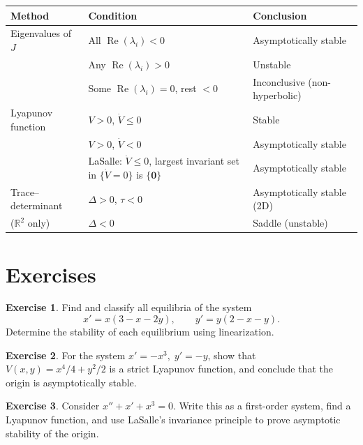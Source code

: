 \documentclass[12pt,a4paper,openany]{book}
\theoremstyle{definition}
\newtheorem{exercise}{Exercise}[chapter]
\theoremstyle{plain}
\theoremstyle{remark}
\newcommand{\R}{\mathbb{R}}
\begin{document}
\begin{center}
\renewcommand{\arraystretch}{1.35}
\begin{tabular}{@{}p{3.8cm}p{5.5cm}p{4.5cm}@{}}
\toprule
\textbf{Method} & \textbf{Condition} & \textbf{Conclusion} \\
\midrule
Eigenvalues of~\(J\) &
All \(\operatorname{Re}(\lambda_i)<0\) &
Asymptotically stable \\
& Any \(\operatorname{Re}(\lambda_i)>0\) &
Unstable \\
& Some \(\operatorname{Re}(\lambda_i)=0\), rest \(<0\) &
Inconclusive (non-hyperbolic) \\
\midrule
Lyapunov function &
\(V>0\), \(\dot{V}\le 0\) &
Stable \\
& \(V>0\), \(\dot{V}<0\) &
Asymptotically stable \\
& LaSalle: \(\dot{V}\le 0\), largest invariant set in \(\{\dot{V}=0\}\) is \(\{\mathbf{0}\}\) &
Asymptotically stable \\
\midrule
Trace--determinant &
\(\Delta>0\), \(\tau<0\) &
Asymptotically stable (2D) \\
(\(\R^2\) only) &
\(\Delta<0\) &
Saddle (unstable) \\
\bottomrule
\end{tabular}
\end{center}

\section{Exercises}
\label{sec:stability-exercises}

\begin{exercise}
\label{exo:classify-equilibria}
Find and classify all equilibria of the system
\[
  x' = x(3-x-2y), \qquad y' = y(2-x-y).
\]
Determine the stability of each equilibrium using linearization.
\end{exercise}

\begin{exercise}
\label{exo:lyapunov-construct}
For the system \(x'=-x^3,\;y'=-y\), show that \(V(x,y)=x^4/4+y^2/2\) is a
strict Lyapunov function, and conclude that the origin is asymptotically stable.
\end{exercise}

\begin{exercise}
\label{exo:lasalle-exercise}
Consider \(x''+x'+x^3=0\). Write this as a first-order system, find a Lyapunov
function, and use LaSalle's invariance principle to prove asymptotic stability
of the origin.
\end{exercise}
\end{document}
